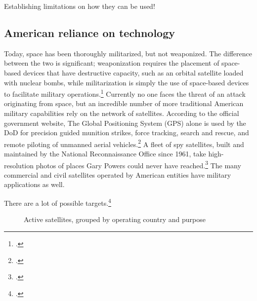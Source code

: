 \documentclass[11pt]{memoir}
\begin{document}



Establishing limitations on how they can be used!

\subsection{American reliance on technology}
Today, space has been thoroughly militarized, but not weaponized. The difference between the two is significant; weaponization requires the placement of space-based devices that have destructive capacity, such as an orbital satellite loaded with nuclear bombs, while militarization is simply the use of space-based devices to facilitate military operations.\footcite[p.~3]{mowthorpe_militarization_2004} Currently no one faces the threat of an attack originating from space, but an incredible number of more traditional American military capabilities rely on the network of satellites. According to the official government website, The Global Positioning System (GPS) alone is used by the DoD for precision guided munition strikes, force tracking, search and rescue, and remote piloting of unmanned aerial vehicles.\footcite{national_coordination_office_for_space-based_positioning_navigation_and_timing_federal_2018} A fleet of spy satellites, built and maintained by the National Reconnaissance Office since 1961, take high-resolution photos of places Gary Powers could never have reached.\footcite{national_reconnaissance_office_about_2019} The many commercial and civil satellites operated by American entities have military applications as well.


There are a lot of possible targets.\footcite[A few satellites are listed as dual-purpose (i.e. Government/Military), and those are counted twice, once for each purpose. For instance, the data shows that the US is currently operating 830 satellites, while adding up the bars in this chart would give you 966. I made this choice to emphasize the dependency of various social systems on the existing satellite infrastructure.]{union_of_concerned_scientists_ucs_2018}


\begin{figure}[ht]
  \centering
  
  \label{country_sats}
  \caption{Active satellites, grouped by operating country and purpose}
\end{figure}
\end{document}

